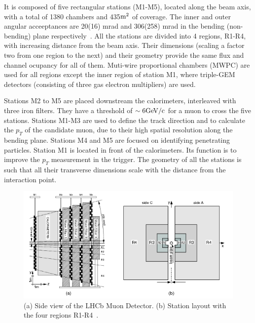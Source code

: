 It is composed of five rectangular stations (M1-M5), located along the beam axis, with a total of 1380 chambers and 435$\rm m^2$ of coverage. The inner and outer angular acceeptances are 20(16) mrad and 306(258) mrad in the bending (non-bending) plane respectively~\cite{Alves:2008zz}. All the stations are divided into 4 regions, R1-R4, with increasing distance from the beam axis. Their dimensions (scaling a factor two  from one region to the next) and their geometry provide the same flux and channel ocupancy for all of them. Muti-wire proportional chambers (MWPC) are used for all regions except the inner region of station M1, where triple-GEM detectors (consisting of three gas electron multipliers) are used. 

Stations M2 to M5 are placed downstream the calorimeters, interleaved with three iron filters. They have a threshold of $\sim 6 \rm GeV/c$ for a muon to cross the five stations. Stations M1-M3 are used to define the track direction and to calculate the $p_T$ of the candidate muon, due to their high spatial resolution along the bending plane. Stations M4 and M5 are focused on identifying penetrating particles. Station M1 is located in front of the calorimeters. Its function is to improve the $p_T$ measurement in the trigger. The geometry of all the stations is such that all their transverse dimensions scale with the distance from the interaction point. %



\begin{figure} [htb!]
\begin{center}
\includegraphics[scale=1.0]{figs/MUON.png}
\caption{(a) Side view of the LHCb Muon Detector. (b) Station layout with the four regions R1-R4~\cite{Alves:2012ey}.\label{fig:lhcb_muon}}
\end{center}
\end{figure}

